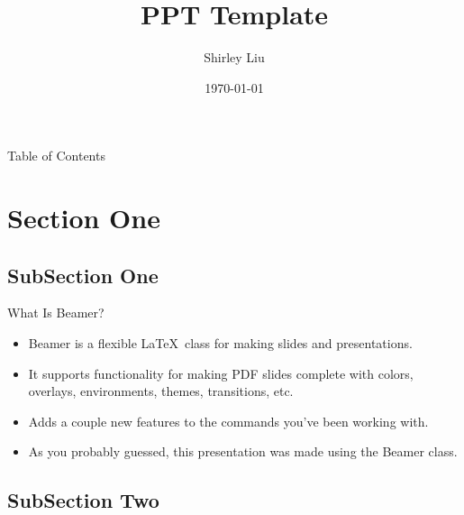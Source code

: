 \documentclass{beamer}
\title{PPT Template}
\author{Shirley Liu}
\date{\today}                                           %
\begin{document}


\begin{frame}
	\thispagestyle{empty}
	\titlepage
\end{frame}
\addtocounter{framenumber}{-1}

\begin{frame}{Table of Contents}
	\tableofcontents
\end{frame}

\section{Section One}

\subsection{SubSection One}

\begin{frame}{What Is Beamer?}
	\begin{itemize}
		\item Beamer is a flexible \LaTeX\ class for making slides and presentations.
		\item It supports functionality for making PDF slides complete with colors, overlays, environments, themes, transitions, etc.
		\item Adds a couple new features to the commands you've been working with.
		\pause
		\item As you probably guessed, this presentation was made using the Beamer class.
	\end{itemize}
\end{frame}


\subsection[Basic Structure]{SubSection Two}
\end{document}
